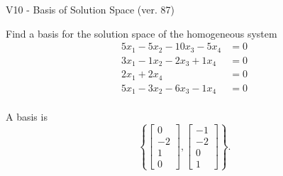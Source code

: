 \begin{exercise}
  \begin{exerciseTitle}V10 - Basis of Solution Space (ver. 87)\end{exerciseTitle}
  \begin{exerciseStatement}
    Find a basis for the solution space of the homogeneous system 
\begin{align*}
 5 x_ 1 -5 x_ 2 -10 x_ 3 -5 x_ 4 &= 0  \\ 
  3 x_ 1 -1 x_ 2 -2 x_ 3 + 1 x_ 4 &= 0  \\ 
  2 x_ 1 + 2 x_ 4 &= 0  \\ 
  5 x_ 1 -3 x_ 2 -6 x_ 3 -1 x_ 4 &= 0  \\ 
 \end{align*}


 
  \end{exerciseStatement}

  \begin{exerciseAnswer}
   A basis is   
\[\left\{\left[\begin{array}{c}
0 \\
-2 \\
1 \\
0
\end{array}\right] , \left[\begin{array}{c}
-1 \\
-2 \\
0 \\
1
\end{array}\right]\right\}.\]

  


  \end{exerciseAnswer}
\end{exercise}